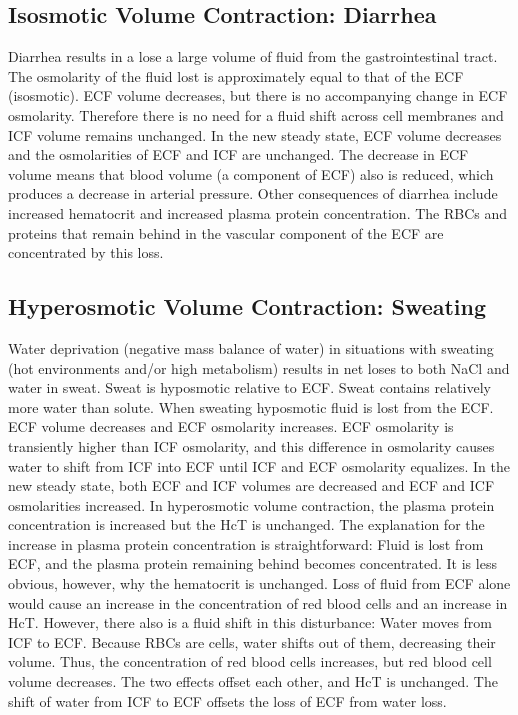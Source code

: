 \subsection{Isosmotic Volume Contraction: Diarrhea}

Diarrhea results in a lose a large volume of fluid from the gastrointestinal tract. The osmolarity of the fluid lost is approximately equal to that of the ECF (isosmotic).  ECF volume decreases, but there is no accompanying change in ECF osmolarity. Therefore there is no need for a fluid shift across cell membranes and ICF volume remains unchanged. In the new steady state, ECF volume decreases and the osmolarities of ECF and ICF are unchanged. The decrease in ECF volume means that blood volume (a component of ECF) also is reduced, which produces a decrease in arterial pressure. Other consequences of diarrhea include increased hematocrit and increased plasma protein concentration. The RBCs and proteins that remain behind in the vascular component of the ECF are concentrated by this loss. 

\subsection{Hyperosmotic Volume Contraction: Sweating}

Water deprivation (negative mass balance of water) in situations with sweating (hot environments and/or high metabolism) results in net loses to both NaCl and water in sweat. Sweat is hyposmotic relative to ECF. Sweat contains relatively more water than solute. When sweating hyposmotic fluid is lost from the ECF. ECF volume decreases and ECF osmolarity increases. ECF osmolarity is transiently higher than ICF osmolarity, and this difference in osmolarity causes water to shift from ICF into ECF until ICF and ECF osmolarity  equalizes. In the new steady state, both ECF and ICF volumes are decreased and ECF and ICF osmolarities increased. In hyperosmotic volume contraction, the plasma protein concentration is increased but the HcT is unchanged. The explanation for the increase in plasma protein concentration is straightforward: Fluid is lost from ECF, and the plasma protein remaining behind becomes concentrated. It is less obvious, however, why the hematocrit is unchanged. Loss of fluid from ECF alone would cause an increase in the concentration of red blood cells and an increase in HcT. However, there also is a fluid shift in this disturbance: Water moves from ICF to ECF. Because RBCs are cells, water shifts out of them, decreasing their volume. Thus, the concentration of red blood cells increases, but red blood cell volume decreases. The two effects offset each other, and HcT is unchanged. The shift of water from ICF to ECF offsets the loss of ECF from water loss.

